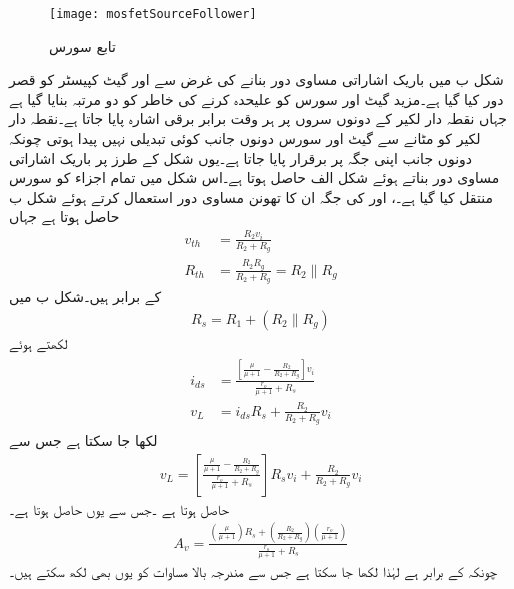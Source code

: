 %
\begin{figure}
\centering
\texttt{[image: mosfetSourceFollower]}
\caption{تابع سورس}
\label{شکل_ماسفیٹ_تابع_مخارج}
\end{figure}
شکل  ب میں باریک اشاراتی مساوی دور بنانے کی غرض سے  اور گیٹ کپیسٹر کو قصر دور کیا گیا ہے۔مزید گیٹ اور سورس کو علیحدہ کرنے کی خاطر  کو دو مرتبہ بنایا گیا ہے جہاں نقطہ دار لکیر کے دونوں سروں پر ہر وقت برابر برقی اشارہ  پایا جاتا ہے۔نقطہ  دار لکیر کو مٹانے سے گیٹ اور سورس دونوں جانب کوئی تبدیلی نہیں پیدا ہوتی چونکہ دونوں جانب  اپنی جگہ پر برقرار پایا جاتا ہے۔یوں شکل  کے طرز پر باریک اشاراتی مساوی دور بناتے ہوئے شکل  الف حاصل ہوتا ہے۔اس شکل میں تمام اجزاء کو سورس منتقل کیا گیا ہے۔،  اور  کی جگہ ان کا تھونن مساوی دور استعمال کرتے ہوئے شکل  ب حاصل ہوتا ہے جہاں
\begin{align*}
v_{th}&=\frac{R_2 v_i}{R_2+R_g}\\
R_{th}&=\frac{R_2 R_g}{R_2+R_g}=R_2 \mathbin{\|} R_g
\end{align*}
کے برابر ہیں۔شکل  ب میں
\begin{align*}
R_s=R_1+\left(R_2 \mathbin{\|} R_g \right)
\end{align*}
لکھتے ہوئے
\begin{gather}
\begin{aligned}\label{مساوات_ماسفیٹ_تابع_مشترک_الف}
i_{ds}&=\frac{\left[\frac{\mu}{\mu+1}-\frac{R_2}{R_2+R_g}\right]v_i}{\frac{r_o}{\mu+1}+R_s}\\
v_L&=i_{ds} R_s+\frac{R_2}{R_2+R_g}v_i
\end{aligned}
\end{gather}
لکھا جا سکتا ہے جس سے
\begin{align*}
v_L=\left[\frac{\frac{\mu}{\mu+1}-\frac{R_2}{R_2+R_g}}{\frac{r_o}{\mu+1}+R_s}\right] R_s v_i+\frac{R_2}{R_2+R_g}v_i
\end{align*}
حاصل ہوتا ہے ۔جس سے  یوں حاصل ہوتا ہے۔
\begin{align}\label{مساوات_ماسفیٹ_تابع_مخارج_افزائش_الف}
A_v=\frac{\left(\frac{\mu}{\mu+1}\right) R_s +\left(\frac{R_2}{R_2+R_g}\right)\left( \frac{r_o}{\mu+1} \right)}{\frac{r_o}{\mu+1}+R_s}
\end{align}
چونکہ  کے برابر ہے لہٰذا  لکھا جا سکتا ہے جس سے  مندرجہ بالا مساوات کو یوں بھی لکھ سکتے ہیں۔
